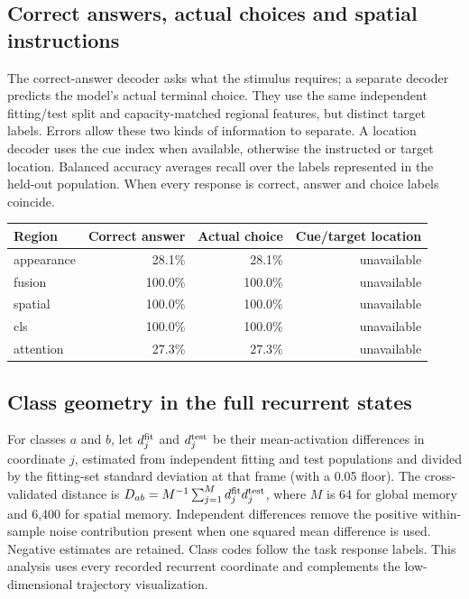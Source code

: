 \documentclass[11pt]{article}
\begin{document}
\subsection{Correct answers, actual choices and spatial instructions}
The correct-answer decoder asks what the stimulus requires; a separate decoder predicts the model's actual terminal choice. They use the same independent fitting/test split and capacity-matched regional features, but distinct target labels. Errors allow these two kinds of information to separate. A location decoder uses the cue index when available, otherwise the instructed or target location. Balanced accuracy averages recall over the labels represented in the held-out population. When every response is correct, answer and choice labels coincide.

\begin{center}\small\begin{tabular}{lrrr}\toprule Region & Correct answer & Actual choice & Cue/target location\\\midrule
appearance & 28.1\% & 28.1\% & unavailable\\
fusion & 100.0\% & 100.0\% & unavailable\\
spatial & 100.0\% & 100.0\% & unavailable\\
cls & 100.0\% & 100.0\% & unavailable\\
attention & 27.3\% & 27.3\% & unavailable\\
\bottomrule\end{tabular}\normalsize\end{center}
\subsection{Class geometry in the full recurrent states}
For classes $a$ and $b$, let $d^{\rm fit}_j$ and $d^{\rm test}_j$ be their mean-activation differences in coordinate $j$, estimated from independent fitting and test populations and divided by the fitting-set standard deviation at that frame (with a 0.05 floor). The cross-validated distance is $D_{ab}=M^{-1}\sum_{j=1}^{M}d^{\rm fit}_j d^{\rm test}_j$, where $M$ is 64 for global memory and 6,400 for spatial memory. Independent differences remove the positive within-sample noise contribution present when one squared mean difference is used. Negative estimates are retained. Class codes follow the task response labels. This analysis uses every recorded recurrent coordinate and complements the low-dimensional trajectory visualization.
\end{document}
